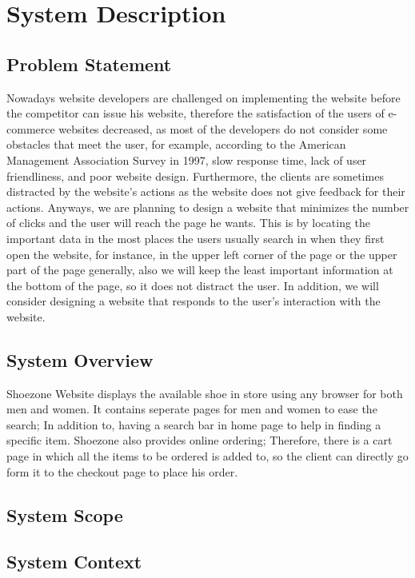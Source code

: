 \documentclass[12pt]{article}
\begin{document}
\section{System Description}

\subsection{Problem Statement}
Nowadays website developers are challenged on implementing the website before the competitor can issue his website, therefore the satisfaction of the users of e-commerce websites decreased, as most of the developers do not consider some obstacles that meet the user, for example, according to the American Management Association Survey in 1997, slow response time, lack of user friendliness, and poor website design. Furthermore, the clients are sometimes distracted by the website’s actions as the website does not give feedback for their actions. 
Anyways, we are planning to design a website that minimizes the number of clicks and the user will reach the page he wants. This is by locating the important data in the most places the users usually search in when they first open the website, for instance, in the upper left corner of the page or the upper part of the page generally, also we will keep the least important information at the bottom of the page, so it does not distract the user. In addition, we will consider designing a website that responds to the user’s interaction with the website. 


\subsection{System Overview}
Shoezone Website displays the available shoe in store using any browser for both men and women. It contains seperate pages for men and women to ease the search; In addition to, having a search bar in home page to help in finding a specific item. Shoezone also provides online ordering; Therefore, there is a cart page in which all the items to be ordered is added to, so the client can directly go form it to the checkout page to place his order.   

\subsection{System Scope}

\subsection{System Context}
\end{document}

